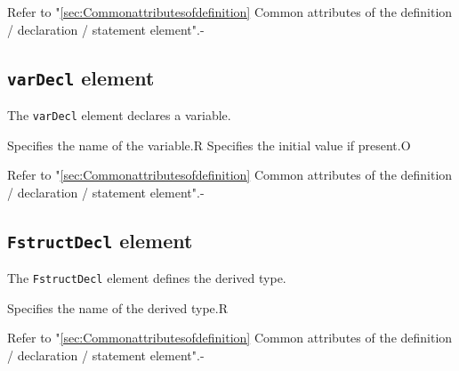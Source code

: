 \begin{XcodeMLAttributes}
{Refer to "\ref{sec:Commonattributesofdefinition} Common attributes of the definition / declaration / statement element".}{-}
\end{XcodeMLAttributes}


\subsection{ {\tt varDecl} element}

The {\tt varDecl} element declares a variable.


\begin{XcodeMLChildElements}
{Specifies the name of the variable.}{R}
{Specifies the initial value if present.}{O}
\end{XcodeMLChildElements}

\begin{XcodeMLAttributes}
{Refer to "\ref{sec:Commonattributesofdefinition} Common attributes of the definition / declaration / statement element".}{-}
\end{XcodeMLAttributes}


\subsection{ {\tt FstructDecl} element}

The {\tt FstructDecl} element defines the derived type.


\begin{XcodeMLChildElements}
{Specifies the name of the derived type.}{R}
\end{XcodeMLChildElements}

\begin{XcodeMLAttributes}
{Refer to "\ref{sec:Commonattributesofdefinition} Common attributes of the definition / declaration / statement element".}{-}
\end{XcodeMLAttributes}


